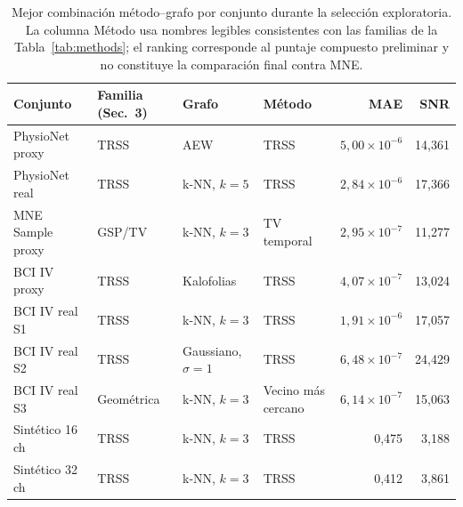 \begin{table}[htbp]
\centering
\scriptsize
\setlength{\tabcolsep}{2.6pt}
\caption{Mejor combinación método--grafo por conjunto durante la selección exploratoria. La columna Método usa nombres legibles consistentes con las familias de la Tabla~\ref{tab:methods}; el ranking corresponde al puntaje compuesto preliminar y no constituye la comparación final contra MNE.}
\label{tab:ch4_preliminary_selection_top_candidates}
\begin{tabular}{@{}p{2.15cm}p{1.75cm}p{2.25cm}p{2.15cm}rr@{}}
\toprule
Conjunto & Familia (Sec.~3) & Grafo & Método & MAE & SNR \\
\midrule
PhysioNet proxy & TRSS & AEW & TRSS & $5{,}00\times10^{-6}$ & 14{,}361 \\
PhysioNet real & TRSS & k-NN, $k=5$ & TRSS & $2{,}84\times10^{-6}$ & 17{,}366 \\
MNE Sample proxy & GSP/TV & k-NN, $k=3$ & TV temporal & $2{,}95\times10^{-7}$ & 11{,}277 \\
BCI IV proxy & TRSS & Kalofolias & TRSS & $4{,}07\times10^{-7}$ & 13{,}024 \\
BCI IV real S1 & TRSS & k-NN, $k=3$ & TRSS & $1{,}91\times10^{-6}$ & 17{,}057 \\
BCI IV real S2 & TRSS & Gaussiano, $\sigma=1$ & TRSS & $6{,}48\times10^{-7}$ & 24{,}429 \\
BCI IV real S3 & Geométrica & k-NN, $k=3$ & Vecino más cercano & $6{,}14\times10^{-7}$ & 15{,}063 \\
Sintético 16 ch & TRSS & k-NN, $k=3$ & TRSS & 0{,}475 & 3{,}188 \\
Sintético 32 ch & TRSS & k-NN, $k=3$ & TRSS & 0{,}412 & 3{,}861 \\
\bottomrule
\end{tabular}
\end{table}
